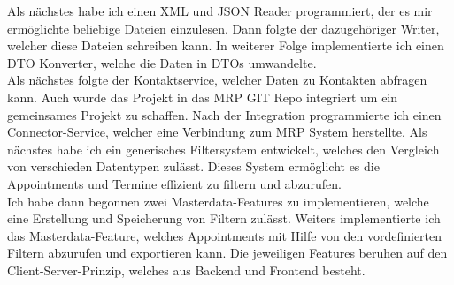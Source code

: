  Als nächstes habe ich einen XML und JSON Reader programmiert, der es mir ermöglichte beliebige Dateien einzulesen. Dann folgte der dazugehöriger Writer, welcher diese Dateien schreiben kann. In weiterer Folge implementierte ich einen DTO Konverter, welche die Daten in DTOs umwandelte. \\

Als nächstes folgte der Kontaktservice, welcher Daten zu Kontakten abfragen kann. Auch wurde das Projekt in das MRP GIT Repo integriert um ein gemeinsames Projekt zu schaffen. Nach der Integration programmierte ich einen Connector-Service, welcher eine Verbindung zum MRP System herstellte. Als nächstes habe ich ein generisches Filtersystem entwickelt, welches den Vergleich von verschieden Datentypen zulässt. Dieses System ermöglicht es die Appointments und Termine effizient zu filtern und abzurufen.\\

Ich habe dann begonnen zwei Masterdata-Features zu implementieren, welche eine Erstellung und Speicherung von Filtern zulässt. Weiters implementierte ich das Masterdata-Feature, welches Appointments mit Hilfe von den vordefinierten Filtern abzurufen und exportieren kann. Die jeweiligen Features beruhen auf den Client-Server-Prinzip, welches aus Backend und Frontend besteht.

